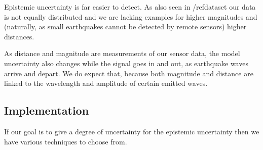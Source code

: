 \documentclass[thesis.tex]{subfiles}
\begin{document}
Epistemic uncertainty is far easier to detect. As also seen in /ref{dataset} our data is not equally distributed and we are lacking examples for higher magnitudes and (naturally, as small earthquakes cannot be detected by remote sensors) higher distances. 

As distance and magnitude are measurements of our sensor data, the model uncertainty also changes while the signal goes in and out, as earthquake waves arrive and depart. We do expect that, because both magnitude and distance are linked to the wavelength and amplitude of certain emitted waves.
\subsection{Implementation}
If our goal is to give a degree of uncertainty for the epistemic uncertainty then we have various techniques to choose from. 



\subfilebib %
\end{document}
